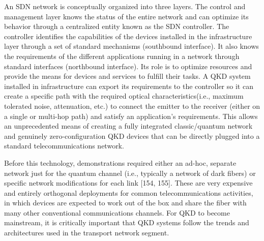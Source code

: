 An SDN network is conceptually organized into three layers. The control and management layer knows the status of the entire network and can optimize its behavior through a centralized entity known as the SDN controller. The controller identifies the capabilities of the devices installed in the infrastructure layer through a set of standard mechanisms (southbound interface). It also knows the requirements of the different applications running in a network through standard interfaces (northbound interface). Its role is to optimize resources and provide the means for devices and services to fulfill their tasks. A QKD system installed in infrastructure can export its requirements to the controller so it can create a specific path with the required optical characteristics(i.e., maximum tolerated noise, attenuation, etc.) to connect the emitter to the receiver (either on a single or multi-hop path) and satisfy an application’s requirements. This allows an unprecedented means of creating a fully integrated classic/quantum network and genuinely zero-configuration QKD devices that can be directly plugged into a standard telecommunications network.

Before this technology, demonstrations required either an ad-hoc, separate network just for the quantum channel (i.e., typically a network of dark fibers) or specific network modifications for each link [154, 155]. These are very expensive and entirely orthogonal deployments for common telecommunications activities, in which devices are expected to work out of the box and share the fiber with many other conventional communications channels. For QKD to become mainstream, it is critically important that QKD systems follow the trends and architectures used in the transport network segment.

